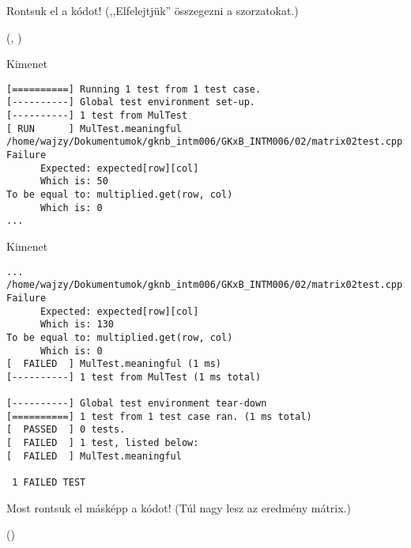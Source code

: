 \begin{frame}
  Rontsuk el a kódot! (,,Elfelejtjük'' összegezni a szorzatokat.)
  \begin{exampleblock}{ %
    (, %
    )}
    
  \end{exampleblock}
\end{frame}

\begin{frame}[fragile]
  \begin{block}{Kimenet}
    \footnotesize
    \begin{verbatim}
[==========] Running 1 test from 1 test case.
[----------] Global test environment set-up.
[----------] 1 test from MulTest
[ RUN      ] MulTest.meaningful
/home/wajzy/Dokumentumok/gknb_intm006/GKxB_INTM006/02/matrix02test.cpp:25: Failure
      Expected: expected[row][col]
      Which is: 50
To be equal to: multiplied.get(row, col)
      Which is: 0
...
\end{verbatim}
  \end{block}
\end{frame}

\begin{frame}[fragile]
  \footnotesize
  \begin{block}{Kimenet}
    \begin{verbatim}
...
/home/wajzy/Dokumentumok/gknb_intm006/GKxB_INTM006/02/matrix02test.cpp:25: Failure
      Expected: expected[row][col]
      Which is: 130
To be equal to: multiplied.get(row, col)
      Which is: 0
[  FAILED  ] MulTest.meaningful (1 ms)
[----------] 1 test from MulTest (1 ms total)

[----------] Global test environment tear-down
[==========] 1 test from 1 test case ran. (1 ms total)
[  PASSED  ] 0 tests.
[  FAILED  ] 1 test, listed below:
[  FAILED  ] MulTest.meaningful

 1 FAILED TEST
\end{verbatim}
  \end{block}
\end{frame}

\begin{frame}
  Most rontsuk el másképp a kódot! (Túl nagy lesz az eredmény mátrix.)
  \begin{exampleblock}{ %
    ()}
    
  \end{exampleblock}
\end{frame}


